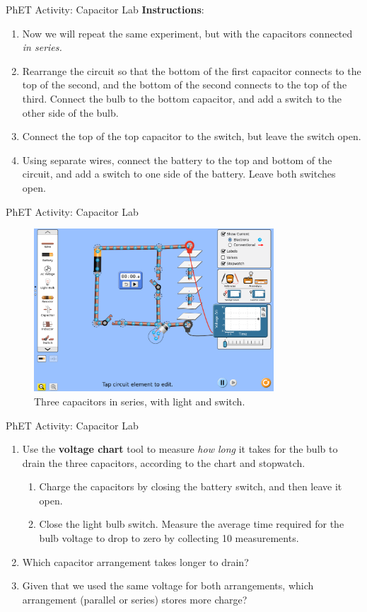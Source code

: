 \documentclass{beamer}
\begin{document}
\begin{frame}{PhET Activity: Capacitor Lab}
\small
\textbf{Instructions}:
\begin{enumerate}
\item Now we will repeat the same experiment, but with the capacitors connected \textit{in series.}
\item Rearrange the circuit so that the bottom of the first capacitor connects to the top of the second, and the bottom of the second connects to the top of the third.  Connect the bulb to the bottom capacitor, and add a switch to the other side of the bulb.
\item Connect the top of the top capacitor to the switch, but leave the switch open.
\item Using separate wires, connect the battery to the top and bottom of the circuit, and add a switch to one side of the battery.  Leave both switches open.
\end{enumerate}
\end{frame}

\begin{frame}{PhET Activity: Capacitor Lab}
\begin{figure}
\centering
\includegraphics[width=0.8\textwidth]{figures/three_cap_3.png}
\caption{\label{fig:phet_cap3} Three capacitors in series, with light and switch.}
\end{figure}
\end{frame}

\begin{frame}{PhET Activity: Capacitor Lab}
\begin{enumerate}
\item Use the \textbf{\alert{voltage chart}} tool to measure \textit{how long} it takes for the bulb to drain the three capacitors, according to the chart and stopwatch.
\begin{enumerate}
\item Charge the capacitors by closing the battery switch, and then leave it open.
\item Close the light bulb switch.  Measure the average time required for the bulb voltage to drop to zero by collecting 10 measurements.
\end{enumerate}
\item Which capacitor arrangement takes longer to drain?
\item Given that we used the same voltage for both arrangements, which arrangement (parallel or series) stores more charge?
\end{enumerate}
\end{frame}
\end{document}
